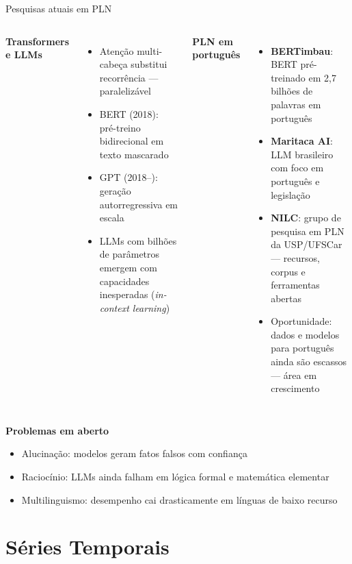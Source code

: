 \documentclass[xcolor=dvipsnames,t,aspectratio=169]{beamer}
\newcommand{\highlight}[1]{{\color{nes_dark_orange} #1}}
\begin{document}
\begin{frame}[c]{Pesquisas atuais em PLN}

\begin{columns}
\textbf{\color{nes_dark_purple}Transformers e LLMs}
\begin{itemize}
    \item \highlight{Atenção multi-cabeça} substitui recorrência — paralelizável
    \item BERT (2018): pré-treino bidirecional em texto mascarado
    \item GPT (2018--): geração autorregressiva em escala
    \item LLMs com bilhões de parâmetros emergem com capacidades inesperadas (\emph{in-context learning})
\end{itemize}


\textbf{\color{nes_dark_purple}PLN em português}
\begin{itemize}
    \item \textbf{BERTimbau}: BERT pré-treinado em 2,7 bilhões de palavras em português
    \item \textbf{Maritaca AI}: LLM brasileiro com foco em português e legislação
    \item \textbf{NILC}: grupo de pesquisa em PLN da USP/UFSCar — recursos, corpus e ferramentas abertas
    \item \highlight{Oportunidade}: dados e modelos para português ainda são escassos — área em crescimento
\end{itemize}
\end{columns}
\textbf{\color{nes_dark_purple}Problemas em aberto}
\begin{itemize}
    \item \highlight{Alucinação}: modelos geram fatos falsos com confiança
    \item \highlight{Raciocínio}: LLMs ainda falham em lógica formal e matemática elementar
    \item \highlight{Multilinguismo}: desempenho cai drasticamente em línguas de baixo recurso
\end{itemize}

\end{frame}


\section{Séries Temporais}
\end{document}
